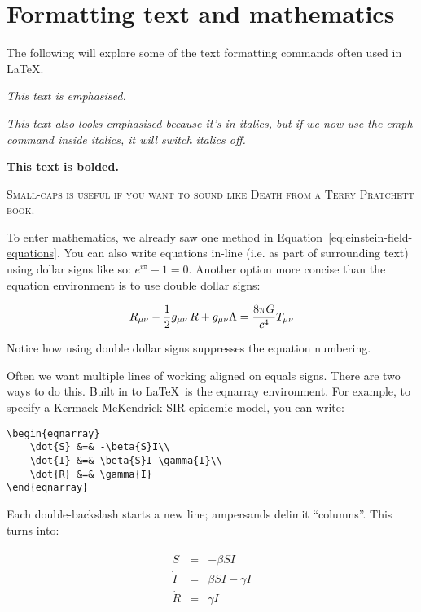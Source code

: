 \section{Formatting text and mathematics}\label{sec:formatting}

The following will explore some of the text formatting commands often used in
\LaTeX.

\emph{This text is emphasised.}

\textit{This text also looks emphasised because it's in italics,
    but if we now use the emph command inside italics,
\emph{it will switch italics off}.}

\textbf{This text is bolded.}

\textsc{Small-caps is useful if you want to sound like Death
from a Terry Pratchett book.}

To enter mathematics, we already saw one method in
Equation~\ref{eq:einstein-field-equations}.
You can also write equations in-line (i.e. as part of surrounding text)
using dollar signs like so: $e^{i\pi} - 1 = 0$.
Another option more concise than the equation environment
is to use double dollar signs:

$$R_{\mu \nu} - {1 \over 2}g_{\mu \nu}\,R + g_{\mu \nu} \Lambda = {8 \pi G \over c^4} T_{\mu \nu}$$

Notice how using double dollar signs suppresses the equation numbering.

Often we want multiple lines of working aligned on equals signs.
There are two ways to do this.
Built in to \LaTeX\ is the eqnarray environment.
For example, to specify a Kermack-McKendrick SIR epidemic model, you can write:

\begin{verbatim}
\begin{eqnarray}
    \dot{S}	&=&	-\beta{S}I\\
    \dot{I}	&=&	\beta{S}I-\gamma{I}\\
    \dot{R}	&=&	\gamma{I}
\end{eqnarray}
\end{verbatim}

Each double-backslash starts a new line; ampersands delimit ``columns''.
This turns into:

\begin{eqnarray}
    \dot{S}	&=&	-\beta{S}I\\
    \dot{I}	&=&	\beta{S}I-\gamma{I}\\
    \dot{R}	&=&	\gamma{I}
\end{eqnarray}

